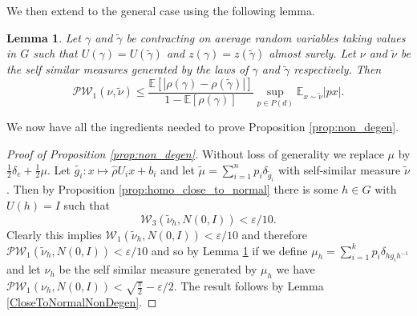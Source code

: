 \documentclass[10pt, english,oneside,reqno]{amsart}
\theoremstyle{plain}
\newtheorem{proposition}[theorem]{Proposition}
\newtheorem{lemma}[theorem]{Lemma}
\theoremstyle{remark}
\numberwithin{equation}{section}
\numberwithin{figure}{section}
\newcommand{\R}{\mathbb{R}}
\begin{document}

We then extend to the general case using the following lemma.

\begin{lemma} \label{lemm:inhom_close_to_normal}
	Let $\gamma$ and $\tilde{\gamma}$ be contracting on average random variables taking values in $G$ such that $U(\gamma) = U(\tilde{\gamma})$ and $z(\gamma) = z(\tilde{\gamma})$ almost surely. Let $\nu$ and $\tilde{\nu}$ be the self similar measures generated by the laws of $\gamma$ and $\tilde{\gamma}$ respectively. Then
	\begin{equation*}
		\mathcal{PW}_1(\nu, \tilde{\nu}) \leq \frac{\mathbb{E} [|\rho(\gamma) - \rho(\tilde{\gamma}) |]}{1 - \mathbb{E}[\rho(\gamma)]} \sup_{p \in P(d)} \mathbb{E}_{x \sim \tilde{\nu}} |px|.
	\end{equation*}
\end{lemma}

We now have all the ingredients needed to prove Proposition \ref{prop:non_degen}.

\begin{proof}[Proof of Proposition \ref{prop:non_degen}] Without        loss of generality we replace $\mu$ by $\frac{1}{2}\delta_e + \frac{1}{2}\mu$. Let $\tilde{g_i}:x \mapsto \hat{\rho} U_i x + b_i$ and let $\tilde{\mu} = \sum_{i=1}^{n} p_i \delta_{\tilde{g}_i}$ with self-similar measure $\tilde{\nu}$. Then by Proposition \ref{prop:homo_close_to_normal} there is some $h \in G$ with $U(h) = I$ such that
    \begin{equation*}
        \mathcal{W}_3(\tilde{\nu}_h, N(0, I)) < \varepsilon / 10.
    \end{equation*}
    Clearly this implies $\mathcal{W}_1(\tilde{\nu}_h, N(0, I)) < \varepsilon / 10$ and therefore $\mathcal{PW}_1(\tilde{\nu}_h, N(0, I)) < \varepsilon / 10$ and so by Lemma \ref{lemm:inhom_close_to_normal} if we define $\mu_h = \sum_{i=1}^{k} p_i \delta_{h g_i h^{-1}}$ and let $\nu_h$ be the self similar measure generated by $\mu_h$ we have $\mathcal{PW}_1(\nu_h, N(0, I)) < \sqrt{\frac{\pi}{2}} - \varepsilon / 2$. The result follows by Lemma \ref{CloseToNormalNonDegen}.
\end{proof}
\end{document}
